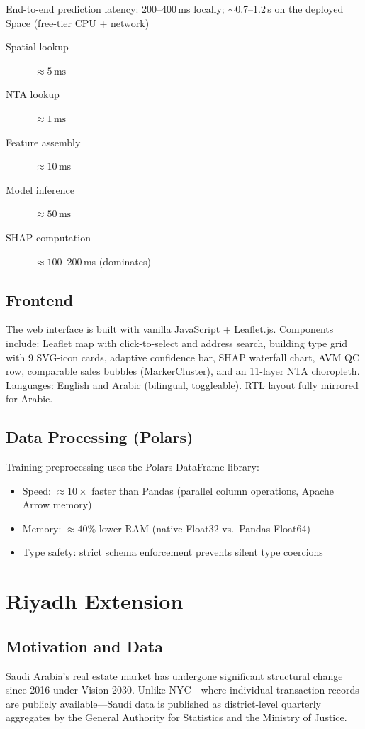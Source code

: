 \documentclass[11pt, a4paper, twoside]{article}
\begin{document}
End-to-end prediction latency: 200--400\,ms locally; $\sim$0.7--1.2\,s on the deployed Space (free-tier CPU + network)
\begin{description}
  \item[Spatial lookup] $\approx 5\,\text{ms}$
  \item[NTA lookup] $\approx 1\,\text{ms}$
  \item[Feature assembly] $\approx 10\,\text{ms}$
  \item[Model inference] $\approx 50\,\text{ms}$
  \item[SHAP computation] $\approx 100$--200\,ms (dominates)
\end{description}

\subsection{Frontend}
The web interface is built with vanilla JavaScript + Leaflet.js. Components
include: Leaflet map with click-to-select and address search, building type
grid with 9 SVG-icon cards, adaptive confidence bar, SHAP waterfall chart,
AVM QC row, comparable sales bubbles (MarkerCluster), and an 11-layer NTA
choropleth. Languages: English and Arabic (bilingual, toggleable). RTL layout
fully mirrored for Arabic.

\subsection{Data Processing (Polars)}
Training preprocessing uses the Polars DataFrame library:
\begin{itemize}
  \item Speed: $\approx 10\times$ faster than Pandas (parallel column operations,
        Apache Arrow memory)
  \item Memory: $\approx 40\%$ lower RAM (native Float32 vs.\ Pandas Float64)
  \item Type safety: strict schema enforcement prevents silent type coercions
\end{itemize}

\section{Riyadh Extension}
\label{sec:riyadh}

\subsection{Motivation and Data}
Saudi Arabia's real estate market has undergone significant structural change
since 2016 under Vision 2030. Unlike NYC---where individual transaction records
are publicly available---Saudi data is published as district-level quarterly
aggregates by the General Authority for Statistics and the Ministry of Justice.
\end{document}
